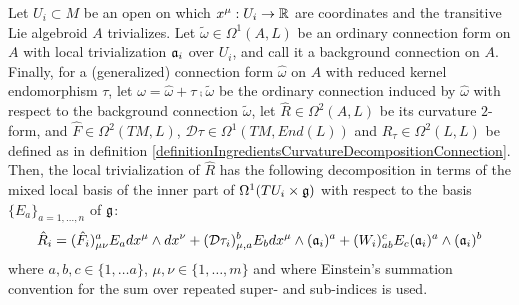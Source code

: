 \begin{theorem}\label{theoremDecompositionOfAlgebroidFormIntoNice2Forms}
Let $U_i \subset M$ be an open on which $x^\mu: U_i \to \mathbb{R}$ are coordinates and the transitive Lie algebroid $A$ trivializes. Let $\tilde \omega\in \Omega^1(A, L)$ be an ordinary connection form on $A$ with local trivialization $\mathfrak{a}_i$ over $U_i$, and call it a background connection on $A$. Finally, for a (generalized) connection form $\hat \omega$ on $A$ with reduced kernel endomorphism $\tau$, let $\omega = \hat \omega + \tau \comp \tilde \omega$ be the ordinary connection induced by $\hat \omega$ with respect to the background connection $\tilde \omega$, let $\hat R \in \Omega^2(A, L)$ be its curvature $2$-form, and $\hat F \in \Omega^2(TM, L)$, $\mathcal D \tau \in \Omega^1(TM, End(L))$ and $R_\tau \in \Omega^2(L, L)$ be defined as in definition \ref{definitionIngredientsCurvatureDecompositionConnection}. Then, the local trivialization of $\hat R$ has the following decomposition in terms of the mixed local basis of the inner part of $\Omega^1(TU_i \times \mathfrak{g})$ with respect to the basis $\{E_a\}_{a = 1, \dots, n}$ of $\mathfrak{g}$:
\begin{equation*}
    \hat R_i = (\hat F_i)_{\mu \nu}^a E_a dx^\mu \wedge dx^\nu + 
                (\mathcal D \tau_i)^b_{\mu, a} E_b  dx^\mu \wedge (\mathfrak{a}_i)^a +
                (W_i)^c_{ab} E_c (\mathfrak{a}_i)^a \wedge (\mathfrak{a}_i)^b
\end{equation*}
where $a, b, c \in \{1, \dots a\}$, $\mu, \nu \in \{1, \dots, m\}$ and where Einstein's summation convention for the sum over repeated super- and sub-indices is used.
\end{theorem}
